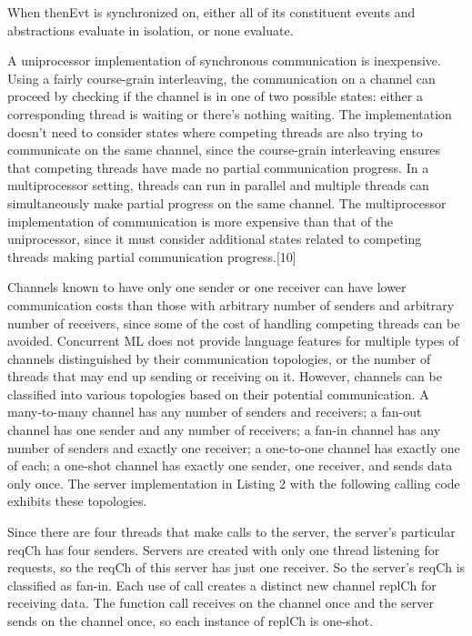 When  thenEvt is synchronized on, either all of its constituent events and abstractions
evaluate in isolation, or none evaluate.


A uniprocessor implementation of synchronous communication is inexpensive.  Using a fairly
course-grain interleaving, the communication on a channel can proceed by checking if the
channel is in one of two possible states: either a corresponding thread is waiting or there's
nothing waiting.  The implementation doesn't need to consider states where competing threads
are also trying to communicate on the same channel, since the course-grain interleaving ensures
that competing threads have made no partial communication progress.  In a multiprocessor
setting, threads can run in parallel and multiple threads can simultaneously make partial
progress on the same channel.  The multiprocessor implementation of communication is more
expensive than that of the uniprocessor, since it must consider additional states related to
competing threads making partial communication progress.[10]

Channels known to have only one sender or one receiver can have lower communication costs than
those with arbitrary number of senders and arbitrary number of receivers, since some of the
cost of handling competing threads can be avoided.  Concurrent ML does not provide language
features for multiple types of channels distinguished by their communication topologies, or the
number of threads that may end up sending or receiving on it.  However, channels can be
classified into various topologies based on their potential communication.  A many-to-many
channel has any number of senders and receivers; a fan-out channel has one sender and any
number of receivers; a fan-in channel has any number of senders and exactly one receiver; a
one-to-one channel has exactly one of each; a one-shot channel has exactly one sender, one
receiver, and sends data only once.  The server implementation in Listing 2  with the following
calling code exhibits these topologies.


Since there are four threads that make calls to the server, the server's particular reqCh has
four senders.  Servers are created with only one thread listening for requests, so the reqCh of
this server has just one receiver.  So the server's reqCh is classified as fan-in.  Each use of
call creates a distinct new channel replCh for receiving data.  The function call receives on
the channel once and the server sends on the channel once, so each instance of replCh is
one-shot.

